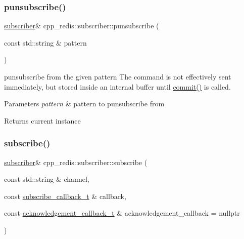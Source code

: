 \subsubsection{\texorpdfstring{punsubscribe()}{punsubscribe()}}
{\footnotesize\ttfamily \mbox{\hyperlink{classcpp__redis_1_1subscriber}{subscriber}}\& cpp\+\_\+redis\+::subscriber\+::punsubscribe (\begin{DoxyParamCaption}\item[{const std\+::string \&}]{pattern }\end{DoxyParamCaption})}

punsubscribe from the given pattern The command is not effectively sent immediately, but stored inside an internal buffer until \mbox{\hyperlink{classcpp__redis_1_1subscriber_af78a5542315daac42998809eeec30eef}{commit()}} is called.


\begin{DoxyParams}{Parameters}
{\em pattern} & pattern to punsubscribe from \\
\hline
\end{DoxyParams}
\begin{DoxyReturn}{Returns}
current instance 
\end{DoxyReturn}
\mbox{\label{classcpp__redis_1_1subscriber_afee579c702182041645a3d3c55de4b9e}} 
\subsubsection{\texorpdfstring{subscribe()}{subscribe()}}
{\footnotesize\ttfamily \mbox{\hyperlink{classcpp__redis_1_1subscriber}{subscriber}}\& cpp\+\_\+redis\+::subscriber\+::subscribe (\begin{DoxyParamCaption}\item[{const std\+::string \&}]{channel,  }\item[{const \mbox{\hyperlink{classcpp__redis_1_1subscriber_a2ac29261280f488dab483866ae875656}{subscribe\+\_\+callback\+\_\+t}} \&}]{callback,  }\item[{const \mbox{\hyperlink{classcpp__redis_1_1subscriber_a19ea39dfabeb19937a9ce4c8d21781b4}{acknowledgement\+\_\+callback\+\_\+t}} \&}]{acknowledgement\+\_\+callback = {\ttfamily nullptr} }\end{DoxyParamCaption})}

